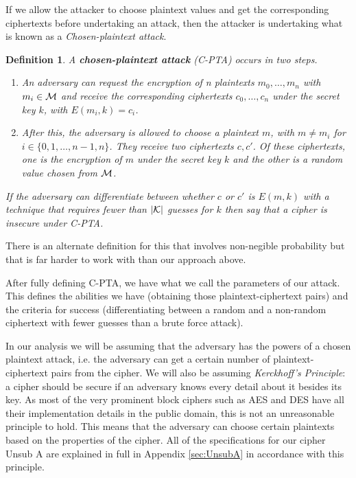 \documentclass[12pt,a4paper]{article}
\newtheorem{definition}[theorem]{Definition}
\begin{document}
If we allow the attacker to choose plaintext values and get the corresponding
ciphertexts before undertaking an attack, then the attacker is undertaking
what is known as a \textit{Chosen-plaintext attack}.

\begin{definition}
A \textbf{chosen-plaintext attack} (C-PTA) occurs in two steps.

\begin{enumerate}
    \item An adversary can request the encryption of n plaintexts $m_0, \ldots,
    m_n$ with $m_i \in \cal{M}$ and receive the corresponding ciphertexts
    $c_0, \ldots, c_n$ under the secret key $k$, with $E(m_i,k) = c_i$. 
    \item After this, the adversary is allowed to choose a plaintext $m$, with
    $m \neq m_i$ for $i \in \{0,1,\ldots,n-1,n\}$. They receive two ciphertexts
    $c,c'$. Of these ciphertexts, one is the encryption of $m$ under the
    secret key $k$ and the other is a random value chosen from $\cal{M}$. 
\end{enumerate}
If the adversary can differentiate between whether $c$ or $c'$ is $E(m,k)$ with
a technique that requires fewer than $|\cal{K}|$ guesses for $k$ then say that
a cipher is insecure under C-PTA.
\end{definition}

There is an alternate definition for this that involves non-negible probability
but that is far harder to work with than our approach above. 

After fully defining C-PTA, we have what we call the parameters of our attack.
This defines the abilities we have (obtaining those plaintext-ciphertext pairs) and
the criteria for success (differentiating between a random and a non-random
ciphertext with fewer guesses than a brute force attack). 

In our analysis we will be assuming that the adversary has the
powers of a chosen plaintext attack, i.e. the adversary can get a certain number of
plaintext-ciphertext pairs from the cipher. We will also be assuming
\textit{Kerckhoff's Principle}: a cipher should be secure if an adversary knows
every detail about it besides its key. As most of the very prominent block
ciphers such as AES and DES have all their implementation details in the public
domain, this is not an unreasonable principle to hold. This means that the
adversary can choose certain plaintexts based on the properties of the cipher.
All of the specifications for our cipher Unsub A are explained in full in Appendix
\ref{sec:UnsubA} in accordance with this principle.
\end{document}
